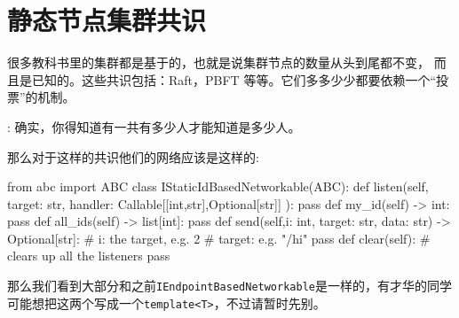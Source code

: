 \section{静态节点集群共识}

很多教科书里的集群都是基于的，也就是说集群节点的数量从头到尾都不变，
而且是已知的。这些共识包括：Raft，PBFT 等等。它们多多少少都要依赖一个``投票''的机制。

 : 确实，你得知道有一共有多少人才能知道是多少人。

\begin{center}
\end{center}

那么对于这样的共识他们的网络应该是这样的:
\begin{simplepy}
from abc import ABC
class IStaticIdBasedNetworkable(ABC):
    def listen(self,
               target: str,
               handler: Callable[[int,str],Optional[str]]
               ):
        pass
    def my_id(self) -> int:
        pass
    def all_ids(self) -> list[int]:
        pass
    def send(self,i: int, target: str, data: str) -> Optional[str]:
        # i: the target, e.g. 2
        # target: e.g. "/hi"
        pass
    def clear(self):                # clears up all the listeners
        pass
\end{simplepy}
那么我们看到大部分和之前\texttt{IEndpointBasedNetworkable}是一样的，有才华的同学
可能想把这两个写成一个\texttt{template<T>}，不过请暂时先别。


